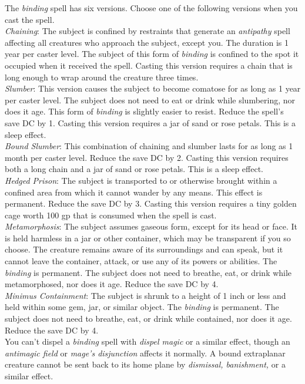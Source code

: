 The \textit{binding }spell has six versions. Choose one of the following versions when you cast the spell.\\
\textit{Chaining}: The subject is confined by restraints that generate an \textit{antipathy }spell affecting all creatures who approach the subject, except you. The duration is 1 year per caster level. The subject of this form of \textit{binding }is confined to the spot it occupied when it received the spell. Casting this version requires a chain that is long enough to wrap around the creature three times.\\
\textit{Slumber}: This version causes the subject to become comatose for as long as 1 year per caster level. The subject does not need to eat or drink while slumbering, nor does it age. This form of \textit{binding }is slightly easier to resist. Reduce the spell's save DC by 1. Casting this version requires a jar of sand or rose petals. This is a sleep effect.\\
\textit{Bound Slumber}: This combination of chaining and slumber lasts for as long as 1 month per caster level. Reduce the save DC by 2. Casting this version requires both a long chain and a jar of sand or rose petals. This is a sleep effect.\\
\textit{Hedged Prison}: The subject is transported to or otherwise brought within a confined area from which it cannot wander by any means. This effect is permanent. Reduce the save DC by 3. Casting this version requires a tiny golden cage worth 100 gp that is consumed when the spell is cast.\\
\textit{Metamorphosis}: The subject assumes gaseous form, except for its head or face. It is held harmless in a jar or other container, which may be transparent if you so choose. The creature remains aware of its surroundings and can speak, but it cannot leave the container, attack, or use any of its powers or abilities. The \textit{binding }is permanent. The subject does not need to breathe, eat, or drink while metamorphosed, nor does it age. Reduce the save DC by 4.\\
\textit{Minimus Containment}: The subject is shrunk to a height of 1 inch or less and held within some gem, jar, or similar object. The \textit{binding }is permanent. The subject does not need to breathe, eat, or drink while contained, nor does it age. Reduce the save DC by 4.\\
You can't dispel a \textit{binding }spell with \textit{dispel magic }or a similar effect, though an \textit{antimagic field }or \textit{mage's disjunction }affects it normally. A bound extraplanar creature cannot be sent back to its home plane by \textit{dismissal, banishment, }or a similar effect.\\
